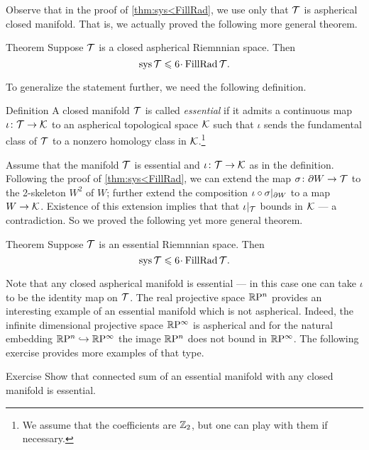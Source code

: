 Observe that in the proof of \ref{thm:sys<FillRad}, we use only that $\mathcal{T}$ is aspherical closed manifold.
That is, we actually proved the following more general theorem.

\begin{thm}{Theorem}\label{thm:sys<FillRad+}
Suppose $\mathcal{T}$ is a closed aspherical Riemnnian space.
Then 
\[\sys\spc{T}\le 6 \cdot \FillRad \spc{T}.\]
\end{thm}


To generalize the statement further, we need the following definition.

\begin{thm}{Definition}
A closed manifold $\mathcal{T}$ is called \emph{essential} if it admits a continuous map $\iota\colon\mathcal{T}\to \mathcal{K}$ to an aspherical topological space $\mathcal{K}$ such that $\iota$ sends the fundamental class of $\mathcal{T}$ to a nonzero homology class in $\mathcal{K}$.\footnote{We assume that the coefficients are $\mathbb{Z}_2$, but one can play with them if necessary.}
\end{thm}

Assume that the manifold $\mathcal{T}$ is essential and $\iota \colon\mathcal{T}\to \mathcal{K}$ as in the definition.
Following the proof of \ref{thm:sys<FillRad}, we can extend the map 
$\sigma\colon\partial W\to \mathcal{T}$ to the 2-skeleton $W^2$ of $W$;
further extend the composition
$\iota\z\circ\sigma|_{\partial W}$ to a map $W\to \mathcal{K}$. 
Existence of this extension implies that that $\iota|_{\mathcal{T}}$ bounds in $\mathcal{K}$ --- a contradiction.
So we proved the following yet more general theorem.

\begin{thm}{Theorem}\label{thm:sys<FillRad++}
Suppose $\mathcal{T}$ is an essential Riemnnian space.
Then 
\[\sys\spc{T}\le 6 \cdot \FillRad \spc{T}.\]
\end{thm}

Note that any closed aspherical manifold is essential --- in this case one can take $\iota$ to be the identity map on $\mathcal{T}$.
The real projective space $\mathbb{R}\mathrm{P}^n$ provides an interesting example of an essential manifold which is not aspherical.
Indeed, the infinite dimensional projective space $\mathbb{R}\mathrm{P}^\infty$ is aspherical and for the natural embedding $\mathbb{R}\mathrm{P}^n\hookrightarrow\mathbb{R}\mathrm{P}^\infty$ the image $\mathbb{R}\mathrm{P}^n$ does not bound in $\mathbb{R}\mathrm{P}^\infty$.
The following exercise provides more examples of that type.

\begin{thm}{Exercise}\label{ex:connected-sum-essential}
Show that connected sum of an essential manifold with any closed manifold is essential.
\end{thm}


